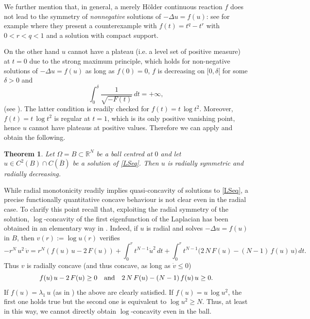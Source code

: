 \documentclass[12pt]{amsart}
\numberwithin{equation}{section}
\newtheorem{theorem}{Theorem}[section]
\theoremstyle{plain}
\theoremstyle{plain}
\theoremstyle{plain}
\theoremstyle{definition}
\newcommand{\R}{{\mathbb R}}
\begin{document}
We further mention that, in general, a merely Hölder continuous reaction $f$ does not lead to the symmetry of \emph{nonnegative} solutions of $-\Delta u =f(u)$: see for example \cite[Section 6.1.3]{DaPa19} where they present a counterexample with $f(t)=t^q-t^r$ with $0<r<q<1$ and a solution with compact support. 

On the other hand $u$ cannot have a plateau (i.e.$\;$a level set of positive measure) at $t=0$ due to the strong maximum principle, which holds for non-negative solutions of $-\Delta u=f(u)$ as long as $f(0)=0$, $f$ is decreasing on $[0, \delta[$ for some $\delta >0$ and 
 \[
 \int_0^\delta\frac{1}{\sqrt{-F(t)}}\, dt =+\infty,
 \]
 (see \cite[Theorem 1.1.1]{PuSe07}). The latter condition is readily checked for $f(t)=t\, \log t^2$.
Moreover, $f(t)=t\, \log t^2$ is regular at $t=1$, which is its only positive vanishing point, hence $u$ cannot have plateaus at positive values. Therefore we can apply \cite[Theorem 2]{DoFe04} and obtain the following.

\begin{theorem}\label{radiality}
Let $\Omega =B \subset \R^N$ be a ball centred at $0$ and let $u\in C^2(B)\cap C(\overline{B})$ be a solution of \eqref{LSeq}. Then $u$ is radially symmetric and radially decreasing. 
\end{theorem}

While radial monotonicity readily implies quasi-concavity of solutions to \eqref{LSeq}, a precise functionally quantitative concave behaviour is not clear even in the radial case. To clarify this point recall that, exploiting the radial symmetry of the solution, $\log$-concavity of the first eigenfunction of the Laplacian has been obtained in an elementary way in \cite{Lind94}. 
Indeed, if $u$ is radial and solves $-\Delta u = f(u)$ in $B$, 
then $v(r):= \log u (r)$ verifies
$$- r^N \, u^2\, \ddot{v} = r^N \left(f(u)\, u - 2\, F(u)\right) + \int_0^r t^{N-1} \dot{u}^2\, dt + \int_0^r t^{N-1} \big( 2\, N\, F(u) - (N-1) \, f(u)\, u\big)\, dt.$$
Thus $v$ is radially concave (and thus concave, as long as $\dot{v}\leq 0$)
$$f(u)\, u - 2\, F(u) \geq 0 \quad \hbox{and} \quad 2\, N \, F(u) - (N-1) \, f(u)\, u \geq 0.$$
If $f(u)= \lambda_1\, u$ (as in \cite{Lind94}) the above are clearly satisfied.
If $f(u)= u\, \log u^2$, the first one holds true but the second one is equivalent to $\log u^2 \geq N$. 
Thus, at least in this way, we cannot directly obtain $\log$-concavity even in the ball.
\end{document}
